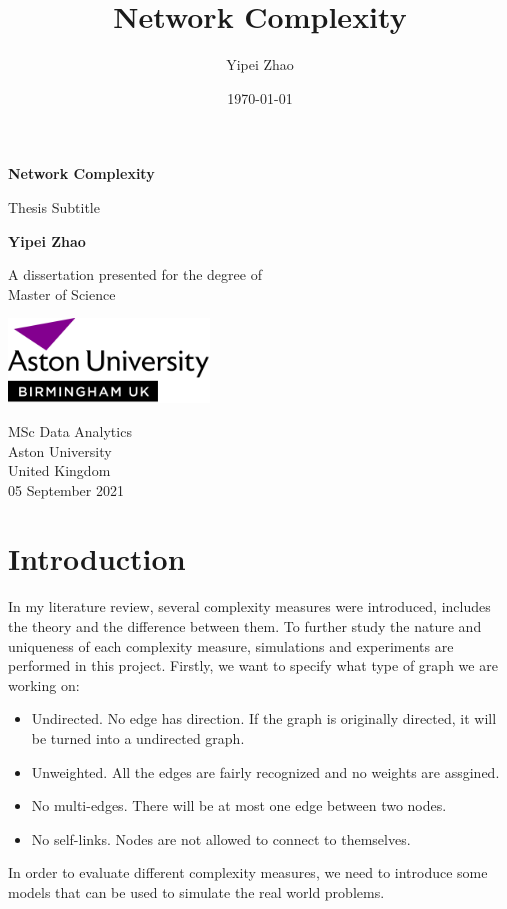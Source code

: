 \documentclass[12pt]{article}
\title{Network Complexity}
\author{Yipei Zhao}
\date{\today}
\begin{document}
\begin{titlepage}
    \begin{center}
        \vspace*{1cm}
            
        \Huge
        \textbf{Network Complexity}
            
        \vspace{0.5cm}
        \LARGE
        Thesis Subtitle
            
        \vspace{1.5cm}
            
        \textbf{Yipei Zhao}
            
        \vfill
            
        A dissertation presented for the degree of\\
        Master of Science
            
        \vspace{0.8cm}
            
        \includegraphics[width=0.4\textwidth]{university.png}
            
        \Large
        MSc Data Analytics\\
        Aston University\\
        United Kingdom\\
        05 September 2021
            
    \end{center}
\end{titlepage}
\tableofcontents
\pagebreak
\section{Introduction}
In my literature review, several complexity measures were introduced, includes the theory and the difference between them. To further study the nature and uniqueness of each complexity measure, simulations and experiments are performed in this project. Firstly, we want to specify what type of graph we are working on:
\begin{itemize}
    \item Undirected. No edge has direction. If the graph is originally directed, it will be turned into a undirected graph.
    \item Unweighted. All the edges are fairly recognized and no weights are assgined.
    \item No multi-edges. There will be at most one edge between two nodes.
    \item No self-links. Nodes are not allowed to connect to themselves. 
\end{itemize}
In order to evaluate different complexity measures, we need to introduce some models that can be used to simulate the real world problems.
\end{document}

